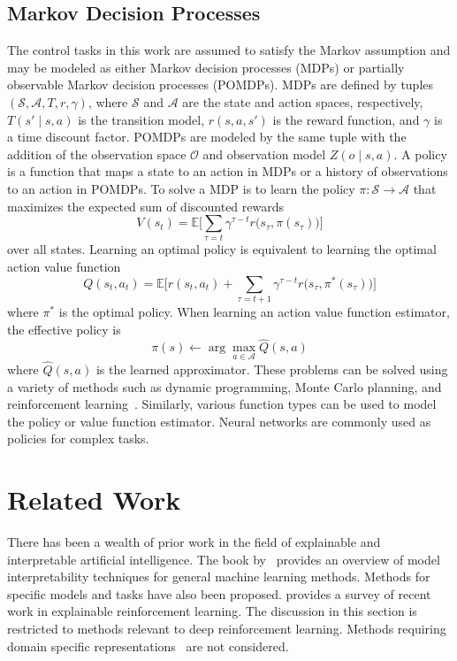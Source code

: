 \documentclass[letterpaper]{article} %
\begin{document}
\subsection{Markov Decision Processes}
The control tasks in this work are assumed to satisfy the Markov assumption and may be modeled as either Markov decision processes (MDPs) or partially observable Markov decision processes (POMDPs).
MDPs are defined by tuples $(\mathcal{S}, \mathcal{A}, T, r, \gamma)$, where $\mathcal{S}$ and $\mathcal{A}$ are the state and action spaces, respectively, $T(s' \mid s, a)$ is the transition model, $r(s, a, s')$ is the reward function, and $\gamma$ is a time discount factor.
POMDPs are modeled by the same tuple with the addition of the observation space $\mathcal{O}$ and observation model $Z(o \mid s, a)$.
A policy is a function that maps a state to an action in MDPs or a history of observations to an action in POMDPs.
To solve a MDP is to learn the policy $\pi: \mathcal{S} \to \mathcal{A}$ that maximizes the expected sum of discounted rewards
\begin{equation}
V(s_t) = \mathbb{E}\Bigg[\sum_{\tau=t} \gamma^{\tau-t} r\big(s_\tau, \pi(s_\tau)\big)\Bigg]
\end{equation}
over all states.
Learning an optimal policy is equivalent to learning the optimal action value function
\begin{equation}
Q(s_t, a_t) = \mathbb{E}\Bigg[r(s_t, a_t) + \sum_{\tau=t+1} \gamma^{\tau-t} r\big(s_\tau, \pi^*(s_\tau)\big)\Bigg]
\end{equation}
where $\pi^*$ is the optimal policy.
When learning an action value function estimator, the effective policy is
\begin{equation}
\pi(s) \gets \arg\max_{a \in \mathcal{A}} \hat{Q}(s, a)
\end{equation}
where $\hat{Q}(s, a)$ is the learned approximator.
These problems can be solved using a variety of methods such as dynamic programming, Monte Carlo planning, and reinforcement learning~\cite{kochenderfer2022}. %
Similarly, various function types can be used to model the policy or value function estimator.
Neural networks are commonly used as policies for complex tasks.

\section{Related Work}
There has been a wealth of prior work in the field of explainable and interpretable artificial intelligence.
The book by~\citet{molnar2019} provides an overview of model interpretability techniques for general machine learning methods.
Methods for specific models and tasks have also been proposed.
\citet{puiutta2020} provides a survey of recent work in explainable reinforcement learning.
The discussion in this section is restricted to methods relevant to deep reinforcement learning.
Methods requiring domain specific representations~\cite{verma2018}
are not considered.
\end{document}
